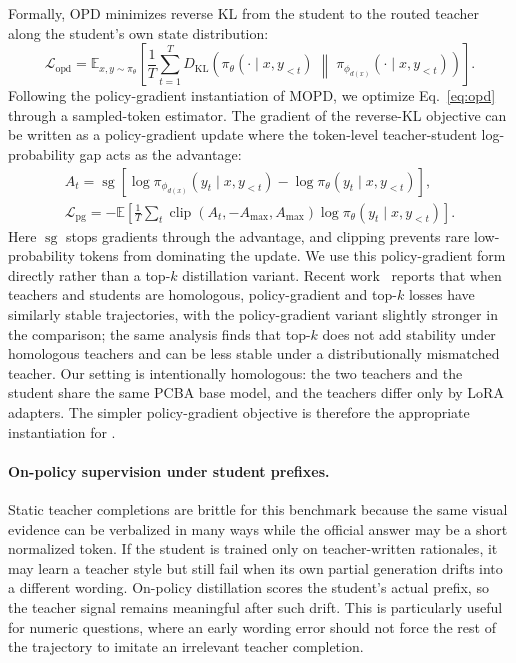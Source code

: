 \documentclass[sigconf, screen, review, anonymous]{acmart}
\begin{document}
Formally, OPD minimizes reverse KL from the student to the routed teacher along the student's own state distribution:
\begin{equation}
\mathcal{L}_{\mathrm{opd}} =
\mathbb{E}_{x,y\sim\pi_\theta}
\left[
\frac{1}{T}\sum_{t=1}^{T}
D_{\mathrm{KL}}\left(
\pi_\theta(\cdot\mid x,y_{<t}) \;\middle\|\;
\pi_{\phi_{d(x)}}(\cdot\mid x,y_{<t})
\right)
\right].
\label{eq:opd}
\end{equation}
Following the policy-gradient instantiation of MOPD, we optimize Eq.~\ref{eq:opd} through a sampled-token estimator. The gradient of the reverse-KL objective can be written as a policy-gradient update where the token-level teacher-student log-probability gap acts as the advantage:
\begin{align}
A_t =
\operatorname{sg}\left[
\log \pi_{\phi_{d(x)}}(y_t\mid x,y_{<t})
- \log \pi_\theta(y_t\mid x,y_{<t})
\right], \label{eq:advantage}\\
\mathcal{L}_{\mathrm{pg}} =
-\mathbb{E}\left[
\frac{1}{T}\sum_t \operatorname{clip}(A_t,-A_{\max},A_{\max})
\log \pi_\theta(y_t\mid x,y_{<t})
\right].
\label{eq:pg}
\end{align}
Here $\operatorname{sg}$ stops gradients through the advantage, and clipping prevents rare low-probability tokens from dominating the update. We use this policy-gradient form directly rather than a top-$k$ distillation variant. Recent work~\cite{ma2026mopd} reports that when teachers and students are homologous, policy-gradient and top-$k$ losses have similarly stable trajectories, with the policy-gradient variant slightly stronger in the comparison; the same analysis finds that top-$k$ does not add stability under homologous teachers and can be less stable under a distributionally mismatched teacher. Our setting is intentionally homologous: the two teachers and the student share the same PCBA base model, and the teachers differ only by LoRA adapters. The simpler policy-gradient objective is therefore the appropriate instantiation for \method{}.

\paragraph{On-policy supervision under student prefixes.}
Static teacher completions are brittle for this benchmark because the same visual evidence can be verbalized in many ways while the official answer may be a short normalized token. If the student is trained only on teacher-written rationales, it may learn a teacher style but still fail when its own partial generation drifts into a different wording. On-policy distillation scores the student's actual prefix, so the teacher signal remains meaningful after such drift. This is particularly useful for numeric questions, where an early wording error should not force the rest of the trajectory to imitate an irrelevant teacher completion.
\end{document}
